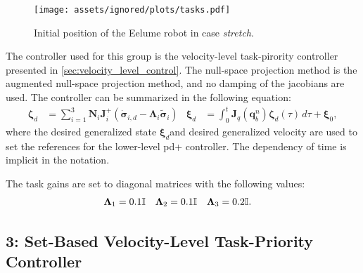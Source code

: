 \begin{figure}[!ht]
    \centering
    \texttt{[image: assets/ignored/plots/tasks.pdf]}
    \caption{Initial position of the Eelume robot in case \textit{stretch}.}
    \label{fig:eelume:tpc:tasks:stretch}
\end{figure}

The controller used for this group is the velocity-level task-pirority controller
presented in \autoref{sec:velocity_level_control}. The null-space projection method
is the augmented null-space projection method, and no damping of the jacobians
are used. The controller can be summarized in the following equation:
\begin{subequations}
\begin{align}
    \bm{\zeta}_d &= \sum_{i=1}^{3} \bm{N}_{i} \bm{J}_i^{+} \left( \dot{\bm{\sigma}}_{i,d} - \bm{\Lambda}_i \tilde{\bm{\sigma}}_i\right)  &
    \bm{\xi}_d &= \int_0^t \bm{J}_q(\bm{q}_b^n)\bm{\zeta}_d(\tau) \, d\tau + \bm{\xi}_0,
\end{align}
\end{subequations}
where the desired generalized state \(\bm{\xi}_d\)and desired generalized velocity
are used to set the references for the lower-level \gls{pd+} controller. The dependency
of time is implicit in the notation.

The task gains are set to diagonal matrices with the following values:
\begin{align}
    \bm{\Lambda}_1 &= 0.1 \mathbb{I} &
    \bm{\Lambda}_2 &= 0.1 \mathbb{I} &
    \bm{\Lambda}_3 &= 0.2 \mathbb{I}.
\end{align}

\FloatBarrier

\subsection*{3: Set-Based Velocity-Level Task-Priority Controller}

